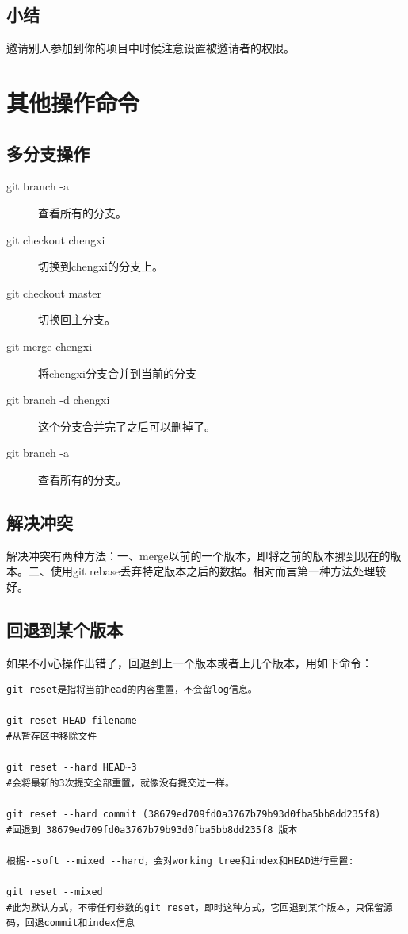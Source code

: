 \documentclass[a4paper,12pt]{ctexbook}
\begin{document}
\begin{flushleft}
\section{小结}
邀请别人参加到你的项目中时候注意设置被邀请者的权限。


\chapter{其他操作命令}
\section{多分支操作}
\begin{description}
  \item[git branch -a]  查看所有的分支。
  \item[git checkout chengxi]   切换到chengxi的分支上。
  \item[git checkout master]    切换回主分支。
  \item[git merge chengxi]  将chengxi分支合并到当前的分支
  \item[git branch -d chengxi]  这个分支合并完了之后可以删掉了。
  \item[git branch -a]  查看所有的分支。
\end{description}

\section{解决冲突}
解决冲突有两种方法：一、merge以前的一个版本，即将之前的版本挪到现在的版本。二、使用git rebase丢弃特定版本之后的数据。相对而言第一种方法处理较好。

\section{回退到某个版本}
如果不小心操作出错了，回退到上一个版本或者上几个版本，用如下命令：
\begin{verbatim}
git reset是指将当前head的内容重置，不会留log信息。

git reset HEAD filename
#从暂存区中移除文件

git reset --hard HEAD~3
#会将最新的3次提交全部重置，就像没有提交过一样。

git reset --hard commit (38679ed709fd0a3767b79b93d0fba5bb8dd235f8)
#回退到 38679ed709fd0a3767b79b93d0fba5bb8dd235f8 版本

根据--soft --mixed --hard，会对working tree和index和HEAD进行重置:

git reset --mixed
#此为默认方式，不带任何参数的git reset，即时这种方式，它回退到某个版本，只保留源码，回退commit和index信息


\end{verbatim}
\end{flushleft}
\end{document}
